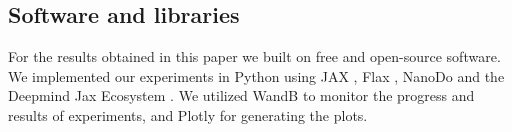 \documentclass{article} \usepackage{iclr2025,times}
\begin{document}
\subsection{Software and libraries}
\label{sec:software}
For the results obtained in this paper we built on free and open-source software.
We implemented our experiments in Python using JAX \citep[][Apache License 2.0]{bradbury_jax_2018}, Flax \citep[][Apache License 2.0]{heek_flax_2023}, NanoDo \citep[][Apache License 2.0]{liu_nanodo_2024} and the Deepmind Jax Ecosystem \citep[][Apache License 2.0]{babuschkin_deepmind_2020}.
We utilized WandB \citep[][MIT license]{biewald_experiment_2020} to monitor the progress and results of experiments, and Plotly  \citep[][MIT license]{inc_collaborative_2015} for generating the plots.
\clearpage{}
\end{document}
